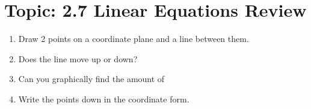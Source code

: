 \documentclass[12pt,letterpaper]{article}
\begin{document}

\newpage
\section*{Topic: 2.7 Linear Equations Review}
\begin{enumerate}
    \item Draw 2 points on a coordinate plane and a line between them.
    \item Does the line move up or down?
    \item Can you graphically find the amount of
    \item Write the points down in the coordinate form.
\end{enumerate}
\end{document}
